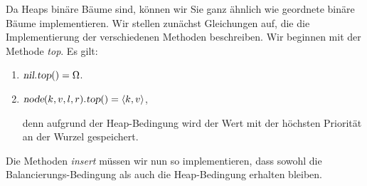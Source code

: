 Da Heaps bin\"are
B\"aume sind, k\"onnen wir Sie ganz \"ahnlich wie geordnete bin\"are B\"aume  implementieren. 
Wir stellen zun\"achst Gleichungen auf, die die Implementierung der verschiedenen Methoden
beschreiben.  Wir beginnen mit der  Methode \textsl{top}.  Es gilt:
\begin{enumerate}
\item $\textsl{nil}.\textsl{top}() = \Omega$.
\item $\textsl{node}(k,v,l,r).\textsl{top}() = \pair(k,v)$,

      denn aufgrund der Heap-Bedingung wird der Wert mit der h\"ochsten Priorit\"at 
      an der Wurzel gespeichert.
\end{enumerate}
Die Methoden \textsl{insert} m\"ussen wir nun so implementieren, dass
sowohl die Balancierungs-Bedingung als auch die Heap-Bedingung erhalten bleiben.
